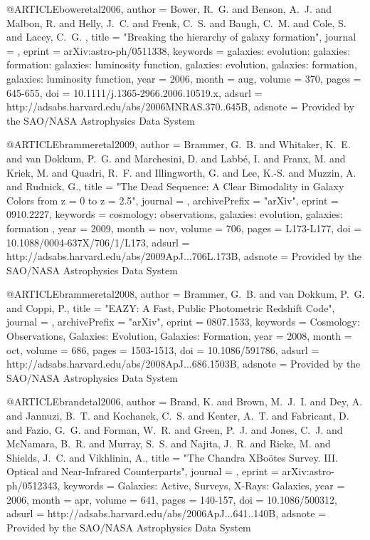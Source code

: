 {{{{{{{{@ARTICLE{boweretal2006,
   author = {{Bower}, R.~G. and {Benson}, A.~J. and {Malbon}, R. and {Helly}, J.~C. and 
	{Frenk}, C.~S. and {Baugh}, C.~M. and {Cole}, S. and {Lacey}, C.~G.
	},
    title = "{Breaking the hierarchy of galaxy formation}",
  journal = {\mnras},
   eprint = {arXiv:astro-ph/0511338},
 keywords = {galaxies: evolution: galaxies: formation: galaxies: luminosity function, galaxies: evolution, galaxies: formation, galaxies: luminosity function},
     year = 2006,
    month = aug,
   volume = 370,
    pages = {645-655},
      doi = {10.1111/j.1365-2966.2006.10519.x},
   adsurl = {http://adsabs.harvard.edu/abs/2006MNRAS.370..645B},
  adsnote = {Provided by the SAO/NASA Astrophysics Data System}
}

@ARTICLE{brammeretal2009,
   author = {{Brammer}, G.~B. and {Whitaker}, K.~E. and {van Dokkum}, P.~G. and 
	{Marchesini}, D. and {Labb{\'e}}, I. and {Franx}, M. and {Kriek}, M. and 
	{Quadri}, R.~F. and {Illingworth}, G. and {Lee}, {K.-S.} and 
	{Muzzin}, A. and {Rudnick}, G.},
    title = "{The Dead Sequence: A Clear Bimodality in Galaxy Colors from z = 0 to z = 2.5}",
  journal = {\apjl},
archivePrefix = "arXiv",
   eprint = {0910.2227},
 keywords = {cosmology: observations, galaxies: evolution, galaxies: formation },
     year = 2009,
    month = nov,
   volume = 706,
    pages = {L173-L177},
      doi = {10.1088/0004-637X/706/1/L173},
   adsurl = {http://adsabs.harvard.edu/abs/2009ApJ...706L.173B},
  adsnote = {Provided by the SAO/NASA Astrophysics Data System}
}


@ARTICLE{brammeretal2008,
   author = {{Brammer}, G.~B. and {van Dokkum}, P.~G. and {Coppi}, P.},
    title = "{EAZY: A Fast, Public Photometric Redshift Code}",
  journal = {\apj},
archivePrefix = "arXiv",
   eprint = {0807.1533},
 keywords = {Cosmology: Observations, Galaxies: Evolution, Galaxies: Formation},
     year = 2008,
    month = oct,
   volume = 686,
    pages = {1503-1513},
      doi = {10.1086/591786},
   adsurl = {http://adsabs.harvard.edu/abs/2008ApJ...686.1503B},
  adsnote = {Provided by the SAO/NASA Astrophysics Data System}
}


@ARTICLE{brandetal2006,
   author = {{Brand}, K. and {Brown}, M.~J.~I. and {Dey}, A. and {Jannuzi}, B.~T. and 
	{Kochanek}, C.~S. and {Kenter}, A.~T. and {Fabricant}, D. and 
	{Fazio}, G.~G. and {Forman}, W.~R. and {Green}, P.~J. and {Jones}, C.~J. and 
	{McNamara}, B.~R. and {Murray}, S.~S. and {Najita}, J.~R. and 
	{Rieke}, M. and {Shields}, J.~C. and {Vikhlinin}, A.},
    title = "{The Chandra XBo{\"o}tes Survey. III. Optical and Near-Infrared Counterparts}",
  journal = {\apj},
   eprint = {arXiv:astro-ph/0512343},
 keywords = {Galaxies: Active, Surveys, X-Rays: Galaxies},
     year = 2006,
    month = apr,
   volume = 641,
    pages = {140-157},
      doi = {10.1086/500312},
   adsurl = {http://adsabs.harvard.edu/abs/2006ApJ...641..140B},
  adsnote = {Provided by the SAO/NASA Astrophysics Data System}
}



}}}}}}}}
